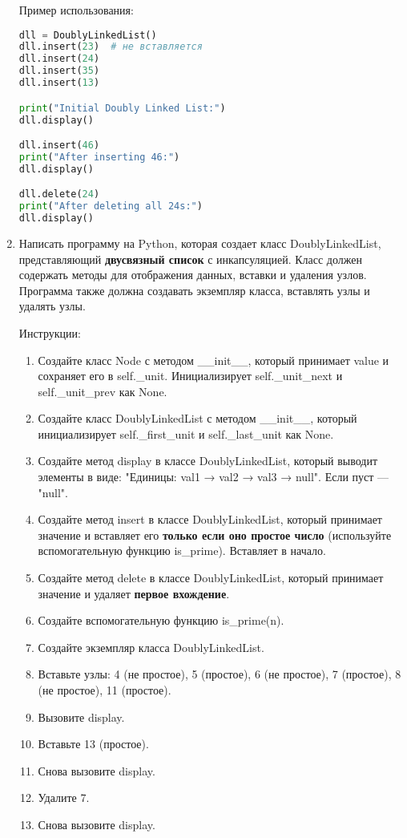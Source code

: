 \begin{enumerate}
Пример использования:
\begin{lstlisting}[language=Python]
dll = DoublyLinkedList()
dll.insert(23)  # не вставляется
dll.insert(24)
dll.insert(35)
dll.insert(13)

print("Initial Doubly Linked List:")
dll.display()

dll.insert(46)
print("After inserting 46:")
dll.display()

dll.delete(24)
print("After deleting all 24s:")
dll.display()
\end{lstlisting}

\item Написать программу на Python, которая создает класс DoublyLinkedList, представляющий \textbf{двусвязный список} с инкапсуляцией. Класс должен содержать методы для отображения данных, вставки и удаления узлов. Программа также должна создавать экземпляр класса, вставлять узлы и удалять узлы.

Инструкции:
\begin{enumerate}
    \item Создайте класс Node с методом \_\_init\_\_, который принимает value и сохраняет его в self.\_unit. Инициализирует self.\_unit\_next и self.\_unit\_prev как None.
    \item Создайте класс DoublyLinkedList с методом \_\_init\_\_, который инициализирует self.\_first\_unit и self.\_last\_unit как None.
    \item Создайте метод display в классе DoublyLinkedList, который выводит элементы в виде: "Единицы: val1 → val2 → val3 → null". Если пуст — "null".
    \item Создайте метод insert в классе DoublyLinkedList, который принимает значение и вставляет его \textbf{только если оно простое число} (используйте вспомогательную функцию is\_prime). Вставляет в начало.
    \item Создайте метод delete в классе DoublyLinkedList, который принимает значение и удаляет \textbf{первое вхождение}.
    \item Создайте вспомогательную функцию is\_prime(n).
    \item Создайте экземпляр класса DoublyLinkedList.
    \item Вставьте узлы: 4 (не простое), 5 (простое), 6 (не простое), 7 (простое), 8 (не простое), 11 (простое).
    \item Вызовите display.
    \item Вставьте 13 (простое).
    \item Снова вызовите display.
    \item Удалите 7.
    \item Снова вызовите display.
\end{enumerate}


\end{enumerate}
